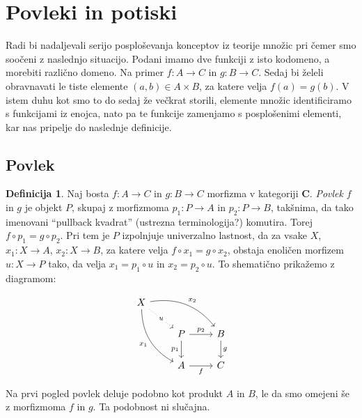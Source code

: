 \documentclass[12pt,a4paper]{book}
\theoremstyle{definition}
\newtheorem{definicija}{Definicija}[chapter]
\theoremstyle{plain}
\theoremstyle{definition}
\theoremstyle{remark}
\newcommand{\cat}[1]{\textbf{#1}}
\begin{document}
\section{Povleki in potiski}
Radi bi nadaljevali serijo posploševanja konceptov iz teorije množic pri čemer smo soočeni z naslednjo situacijo. Podani imamo dve funkciji z isto kodomeno, a morebiti različno domeno. Na primer $f:A \to C$ in $g:B \to C$. Sedaj bi želeli obravnavati le tiste elemente $(a,b) \in A \times B$, za katere velja $f(a) = g(b)$. V istem duhu kot smo to do sedaj že večkrat storili, elemente množic identificiramo s funkcijami iz enojca, nato pa te funkcije zamenjamo s posplošenimi elementi, kar nas pripelje do naslednje definicije.

\subsection{Povlek}

\begin{definicija}
Naj bosta $f : A \to C$ in $g : B \to C$ morfizma v kategoriji $\cat{C}$. \emph{Povlek} $f$ in $g$ je objekt $P$, skupaj z morfizmoma $p_1 : P \to A$ in $p_2 : P \to B$, takšnima, da tako imenovani "`pullback kvadrat"' (ustrezna terminologija?) komutira. Torej $f \circ p_1 = g \circ p_2$. Pri tem je $P$ izpolnjuje univerzalno lastnost, da za vsake $X$, $x_1 : X \to A$, $x_2 : X \to B$, za katere velja $f \circ x_1 = g \circ x_2$, obstaja enoličen morfizem $u : X \to P$ tako, da velja $x_1 = p_1 \circ u$ in $x_2 = p_2 \circ u$. To shematično prikažemo z diagramom:

$$\begin{tikzcd}
X
\arrow[drr, bend left, "x_2"]
\arrow[ddr, bend right, "x_1"']
\arrow[dr, dotted, "u" description] & & \\
& P \arrow[r, "p_2"] \arrow[d, "p_1"']
& B \arrow[d, "g"] \\
& A \arrow[r, "f"']
& C
\end{tikzcd}$$
\end{definicija}

Na prvi pogled povlek deluje podobno kot produkt $A$ in $B$, le da smo omejeni še z morfizmoma $f$ in $g$. Ta podobnost ni slučajna.
\end{document}
